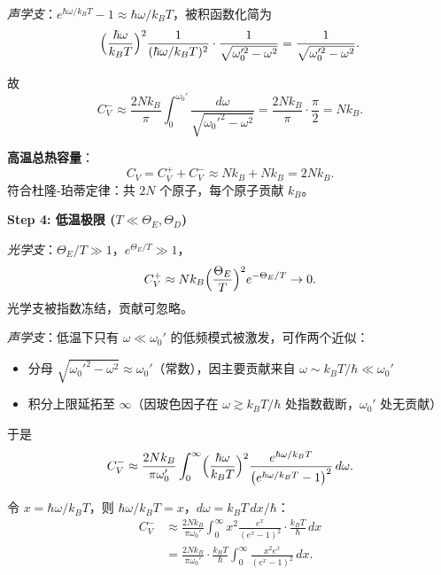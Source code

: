 \begin{derivationbox}[标准解题过程]
\textit{声学支}：$e^{\hbar\omega/k_BT}-1\approx\hbar\omega/k_BT$，被积函数化简为
\begin{equation}
\Bigl(\frac{\hbar\omega}{k_BT}\Bigr)^2\frac{1}{(\hbar\omega/k_BT)^2}\cdot\frac{1}{\sqrt{\omega_0'^2-\omega^2}}=\frac{1}{\sqrt{\omega_0'^2-\omega^2}}.
\end{equation}

故
\begin{equation}
C_V^-\approx\frac{2Nk_B}{\pi}\int_0^{\omega_0'}\frac{d\omega}{\sqrt{\omega_0'^2-\omega^2}}
=\frac{2Nk_B}{\pi}\cdot\frac{\pi}{2}=Nk_B.
\end{equation}

\textbf{高温总热容量}：
\begin{equation}
C_V=C_V^++C_V^-\approx Nk_B+Nk_B=2Nk_B.
\end{equation}
符合杜隆-珀蒂定律：共 $2N$ 个原子，每个原子贡献 $k_B$。

\textbf{Step 4: 低温极限 ($T\ll\Theta_E,\Theta_D$)}

\textit{光学支}：$\Theta_E/T\gg1$，$e^{\Theta_E/T}\gg1$，
\begin{equation}
C_V^+\approx Nk_B\Bigl(\frac{\Theta_E}{T}\Bigr)^2e^{-\Theta_E/T}\to0.
\end{equation}
光学支被指数冻结，贡献可忽略。

\textit{声学支}：低温下只有 $\omega\ll\omega_0'$ 的低频模式被激发，可作两个近似：
\begin{itemize}
    \item 分母 $\sqrt{\omega_0'^2-\omega^2}\approx\omega_0'$（常数），因主要贡献来自 $\omega\sim k_BT/\hbar\ll\omega_0'$
    \item 积分上限延拓至 $\infty$（因玻色因子在 $\omega\gtrsim k_BT/\hbar$ 处指数截断，$\omega_0'$ 处无贡献）
\end{itemize}

于是
\begin{equation}
C_V^-\approx\frac{2Nk_B}{\pi\omega_0'}\int_0^{\infty}\Bigl(\frac{\hbar\omega}{k_BT}\Bigr)^2\frac{e^{\hbar\omega/k_BT}}{\bigl(e^{\hbar\omega/k_BT}-1\bigr)^2}\,d\omega.
\end{equation}

令 $x=\hbar\omega/k_BT$，则 $\hbar\omega/k_BT=x$，$d\omega=k_BT\,dx/\hbar$：
\begin{align}
C_V^-&\approx\frac{2Nk_B}{\pi\omega_0'}\int_0^{\infty}x^2\frac{e^x}{(e^x-1)^2}\cdot\frac{k_BT}{\hbar}\,dx\\
&=\frac{2Nk_B}{\pi\omega_0'}\cdot\frac{k_BT}{\hbar}\int_0^{\infty}\frac{x^2e^x}{(e^x-1)^2}\,dx.
\end{align}


\end{derivationbox}
